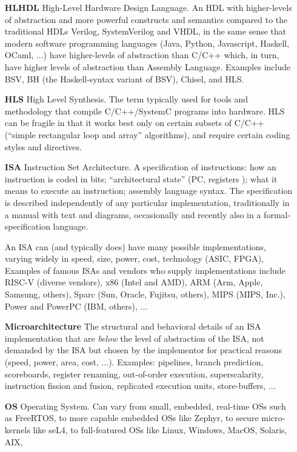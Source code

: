 \begin{itemize}
\item[\bf HLHDL] High-Level Hardware Design Language.  An HDL with
  higher-levels of abstraction and more powerful constructs and
  semantics compared to the traditional HDLs Verilog, SystemVerilog
  and VHDL, in the same sense that modern software programming
  languages (Java, Python, Javascript, Haskell, OCaml, ...) have
  higher-levels of abstraction than C/C++ which, in turn, have higher
  levels of abstraction than Assembly Language.  Examples include BSV,
  BH (the Haskell-syntax variant of BSV), Chisel, and HLS.

\item[\bf HLS] High Level Synthesis.  The term typically used for
  tools and methodology that compile C/C++/SystemC programs into
  hardware.  HLS can be fragile in that it works best only on certain
  subsets of C/C++ (``simple rectangular loop and array'' algorithms),
  and require certain coding styles and directives.

\item[\bf ISA] Instruction Set Architecture.  A specification of
  instructions: how an instruction is coded in bits; ``architectural
  state'' (PC, registers {\etc}); what it means to execute an
  instruction; assembly language syntax.  The specification is
  described independently of any particular implementation,
  traditionally in a manual with text and diagrams, occasionally and
  recently also in a formal-specification language.

  An ISA can (and typically does) have many possible implementations,
  varying widely in speed, size, power, cost, technology (ASIC, FPGA),
  {\etc} Examples of famous ISAs and vendors who supply
  implementations include RISC-V (diverse vendors), x86 (Intel and
  AMD), ARM (Arm, Apple, Samsung, others), Sparc (Sun, Oracle,
  Fujitsu, others), MIPS (MIPS, Inc.), Power and PowerPC (IBM,
  others), ...

\item[\bf Microarchitecture] The structural and behavioral details of
  an ISA implementation that are \emph{below} the level of abstraction
  of the ISA, {\ie} not demanded by the ISA but chosen by the
  implementor for practical reasons (speed, power, area, cost, ...).
  Examples: pipelines, branch prediction, scoreboards, register
  renaming, out-of-order execution, superscalarity, instruction
  fission and fusion, replicated execution units, store-buffers, ...

\item[\bf OS] Operating System.  Can vary from small, embedded,
  real-time OSs such as FreeRTOS, to more capable embedded OSs like
  Zephyr, to secure micro-kernels like seL4, to full-featured OSs like
  Linux, Windows, MacOS, Solaris, AIX, {\etc}


\end{itemize}
